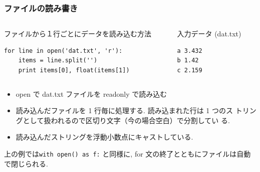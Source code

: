 \begin{frame}[t,fragile]
\frametitle{ファイルの読み書き}
\begin{columns}
\begin{column}{8cm}
ファイルから１行ごとにデータを読み込む方法
\begin{lstlisting}
for line in open('dat.txt', 'r'):
    items = line.split('')
    print items[0], float(items[1])
\end{lstlisting}
\end{column}
\begin{column}{4cm}
入力データ (dat.txt)
\begin{lstlisting}
a 3.432
b 1.42
c 2.159
\end{lstlisting}
\end{column}
\end{columns}

\begin{itemize}
\item open で dat.txt ファイルを readonly で読み込む
\item 読み込んだファイルを 1 行毎に処理する. 読み込まれた行は 1 つのス
      トリングとして扱われるので区切り文字（今の場合空白）で分割してい
      る. 
\item 読み込んだストリングを浮動小数点にキャストしている. 
\end{itemize}
  上の例では\verb|with open() as f:| と同様に, for 文の終了とともにファイルは自動で閉じられる. 
\end{frame}


